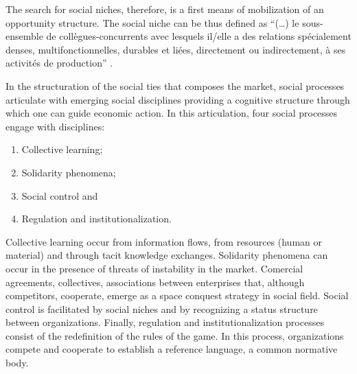 \documentclass[a4paper, 12pt, openright, oneside, german, french, brazil, english, article]{abntex2}
\begin{document}
	The search for social niches, therefore, is a first means of mobilization of an opportunity structure. The social niche can be thus defined as ``(\dots) le sous-ensemble de collègues-concurrents avec lesquels il/elle a des relations spécialement denses, multifonctionnelles, durables et liées, directement ou indirectement, à ses activités de production'' \cite[p. 575]{lazega2009theorie}.
	
	
	In the structuration of the social ties that composes the market, social processes  articulate with emerging social disciplines providing a cognitive structure through which one can guide economic action. In this articulation, four social processes engage with disciplines:
	
	\begin{enumerate}
		\item Collective learning;
		\item Solidarity phenomena;
		\item Social control and
		\item Regulation and institutionalization.
	\end{enumerate}
	
	
	Collective learning occur from information flows, from resources (human or material) and through tacit knowledge exchanges. Solidarity phenomena can occur in the presence of threats of instability in the market. Comercial agreements, collectives, associations between enterprises that, although competitors, cooperate, emerge as a space conquest strategy in social field. Social control is facilitated by social niches and by recognizing a status structure between organizations. Finally, regulation and institutionalization processes consist of the redefinition of the rules of the game. In this process, organizations compete and cooperate to establish a reference language, a common normative body.
	
\end{document}
